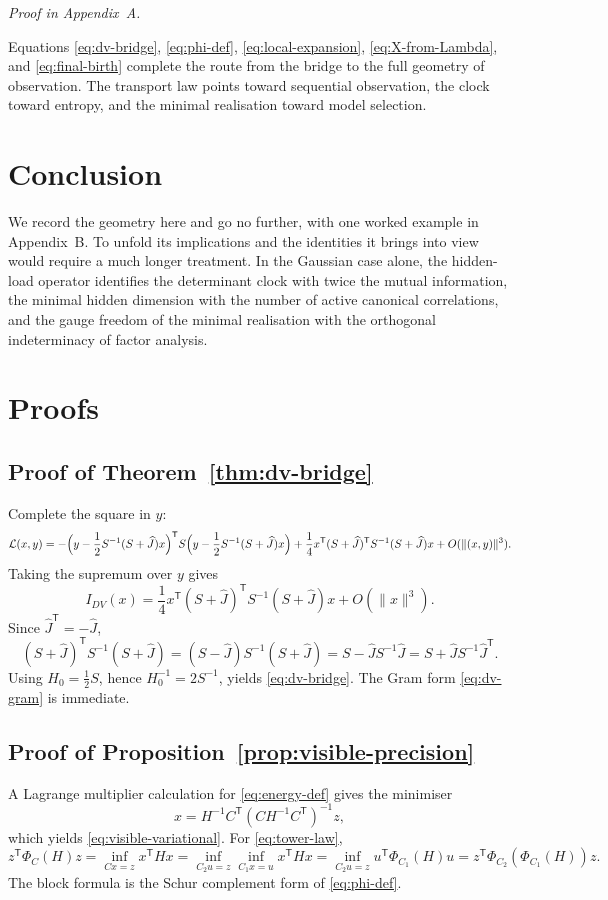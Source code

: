\documentclass[11pt,a4paper]{article}
\numberwithin{equation}{section}
\theoremstyle{thmcompact}
\theoremstyle{remark}
\newcommand{\proofappendix}{\par{\hfill\scriptsize\emph{Proof in Appendix~A.}}\par}
\begin{document}
\proofappendix

Equations \eqref{eq:dv-bridge}, \eqref{eq:phi-def}, \eqref{eq:local-expansion}, \eqref{eq:X-from-Lambda}, and \eqref{eq:final-birth} complete the route from the bridge to the full geometry of observation. The transport law points toward sequential observation, the clock toward entropy, and the minimal realisation toward model selection.

\section{Conclusion}

We record the geometry here and go no further, with one worked example in Appendix~B. To unfold its implications and the identities it brings into view would require a much longer treatment. In the Gaussian case alone, the hidden-load operator identifies the determinant clock with twice the mutual information, the minimal hidden dimension with the number of active canonical correlations, and the gauge freedom of the minimal realisation with the orthogonal indeterminacy of factor analysis.

\newpage

\appendix
\section{Proofs}

\subsection*{Proof of Theorem~\ref{thm:dv-bridge}}
Complete the square in $y$:
\[
\mathcal L(x,y)
=
-\Bigl(y-\frac12S^{-1}(S+\widehat J)x\Bigr)^{\mathsf T}
S
\Bigl(y-\frac12S^{-1}(S+\widehat J)x\Bigr)
+\frac14 x^{\mathsf T}(S+\widehat J)^{\mathsf T}S^{-1}(S+\widehat J)x
+O(\|(x,y)\|^3).
\]
Taking the supremum over $y$ gives
\[
I_{DV}(x)
=
\frac14 x^{\mathsf T}(S+\widehat J)^{\mathsf T}S^{-1}(S+\widehat J)x+O(\|x\|^3).
\]
Since $\widehat J^{\mathsf T}=-\widehat J$,
\[
(S+\widehat J)^{\mathsf T}S^{-1}(S+\widehat J)
=
(S-\widehat J)S^{-1}(S+\widehat J)
=
S-\widehat J S^{-1}\widehat J
=
S+\widehat J S^{-1}\widehat J^{\mathsf T}.
\]
Using $H_0=\tfrac12S$, hence $H_0^{-1}=2S^{-1}$, yields \eqref{eq:dv-bridge}. The Gram form \eqref{eq:dv-gram} is immediate.

\subsection*{Proof of Proposition~\ref{prop:visible-precision}}
A Lagrange multiplier calculation for \eqref{eq:energy-def} gives the minimiser
\[
x=H^{-1}C^{\mathsf T}(CH^{-1}C^{\mathsf T})^{-1}z,
\]
which yields \eqref{eq:visible-variational}. For \eqref{eq:tower-law},
\[
z^{\mathsf T}\Phi_C(H)z
=
\inf_{Cx=z}x^{\mathsf T}Hx
=
\inf_{C_2u=z}\inf_{C_1x=u}x^{\mathsf T}Hx
=
\inf_{C_2u=z}u^{\mathsf T}\Phi_{C_1}(H)u
=
z^{\mathsf T}\Phi_{C_2}(\Phi_{C_1}(H))z.
\]
The block formula is the Schur complement form of \eqref{eq:phi-def}.
\end{document}
